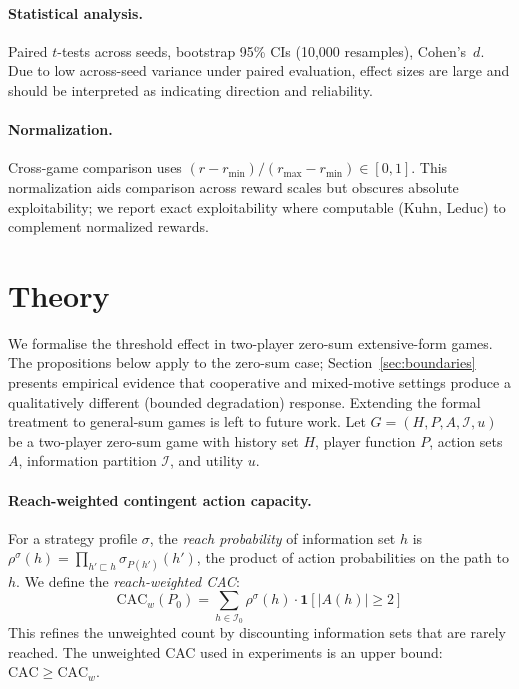 \documentclass{article}
\begin{document}
\paragraph{Statistical analysis.}
Paired $t$-tests across seeds, bootstrap 95\% CIs (10{,}000 resamples), Cohen's~$d$. Due to low across-seed variance under paired evaluation, effect sizes are large and should be interpreted as indicating direction and reliability.

\paragraph{Normalization.}
Cross-game comparison uses $(r - r_{\min}) / (r_{\max} - r_{\min}) \in [0,1]$. This normalization aids comparison across reward scales but obscures absolute exploitability; we report exact exploitability where computable (Kuhn, Leduc) to complement normalized rewards.

\section{Theory}

We formalise the threshold effect in two-player zero-sum extensive-form games. The propositions below apply to the zero-sum case; Section~\ref{sec:boundaries} presents empirical evidence that cooperative and mixed-motive settings produce a qualitatively different (bounded degradation) response. Extending the formal treatment to general-sum games is left to future work. Let $G = (H, P, A, \mathcal{I}, u)$ be a two-player zero-sum game with history set $H$, player function $P$, action sets $A$, information partition $\mathcal{I}$, and utility $u$.

\paragraph{Reach-weighted contingent action capacity.}
For a strategy profile $\sigma$, the \emph{reach probability} of information set $h$ is $\rho^\sigma(h) = \prod_{h' \sqsubset h} \sigma_{P(h')}(h')$, the product of action probabilities on the path to $h$. We define the \emph{reach-weighted CAC}:
\begin{equation}
\text{CAC}_w(P_0) = \sum_{h \in \mathcal{I}_0} \rho^{\sigma}(h) \cdot \mathbf{1}[|A(h)| \geq 2]
\label{eq:cac-w}
\end{equation}
This refines the unweighted count by discounting information sets that are rarely reached. The unweighted CAC used in experiments is an upper bound: $\text{CAC} \geq \text{CAC}_w$.
\end{document}
